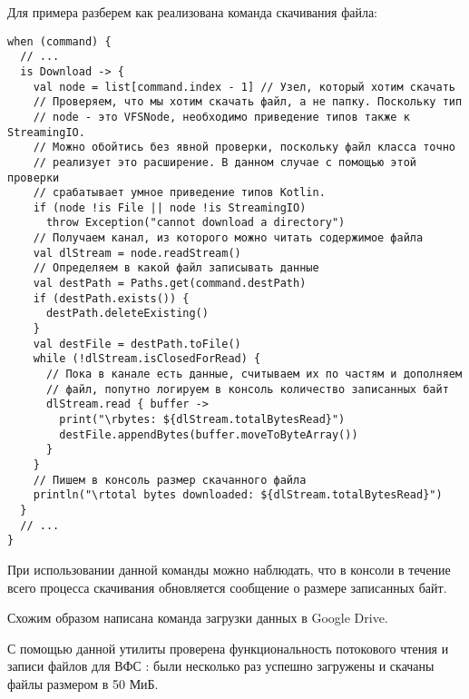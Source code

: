     Для примера разберем как реализована команда скачивания файла:
    \begin{verbatim}
when (command) {      
  // ...
  is Download -> {
    val node = list[command.index - 1] // Узел, который хотим скачать
    // Проверяем, что мы хотим скачать файл, а не папку. Поскольку тип
    // node - это VFSNode, необходимо приведение типов также к StreamingIO.
    // Можно обойтись без явной проверки, поскольку файл класса точно 
    // реализует это расширение. В данном случае с помощью этой проверки 
    // срабатывает умное приведение типов Kotlin.
    if (node !is File || node !is StreamingIO) 
      throw Exception("cannot download a directory")
    // Получаем канал, из которого можно читать содержимое файла
    val dlStream = node.readStream()
    // Определяем в какой файл записывать данные
    val destPath = Paths.get(command.destPath)
    if (destPath.exists()) {
      destPath.deleteExisting()
    }
    val destFile = destPath.toFile()
    while (!dlStream.isClosedForRead) {
      // Пока в канале есть данные, считываем их по частям и дополняем
      // файл, попутно логируем в консоль количество записанных байт
      dlStream.read { buffer ->
        print("\rbytes: ${dlStream.totalBytesRead}")
        destFile.appendBytes(buffer.moveToByteArray())
      }
    }
    // Пишем в консоль размер скачанного файла
    println("\rtotal bytes downloaded: ${dlStream.totalBytesRead}")
  }
  // ...
}
    \end{verbatim}

    При использовании данной команды можно наблюдать, что в консоли в течение всего процесса скачивания обновляется сообщение о размере записанных байт. 
    
    Схожим образом написана команда загрузки данных в Google Drive. 

    С помощью данной утилиты проверена функциональность потокового чтения и записи файлов для ВФС : были несколько раз успешно загружены и скачаны файлы размером в 50 МиБ.

